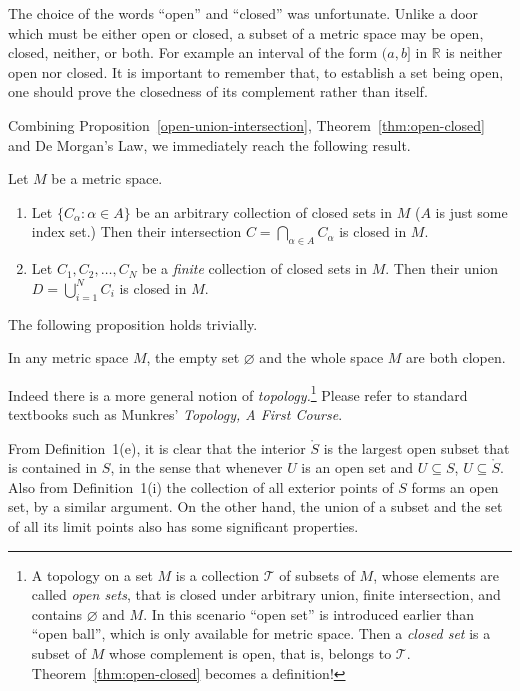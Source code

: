 \documentclass[11pt]{article}
\begin{document}
The choice of the words ``open'' and ``closed'' was unfortunate.
Unlike a door which must be either open or closed, a subset of a metric space may be open, closed, neither, or both.
For example an interval of the form $(a,b]$ in $\mathbb{R}$ is neither open nor closed.
It is important to remember that, to establish a set being open, one should prove the closedness of its complement rather than itself.

Combining Proposition~\ref{open-union-intersection}, Theorem~\ref{thm:open-closed} and De Morgan's Law, we immediately reach the following result.

\begin{prop}
  \label{closed-union-intersection}
  Let $M$ be a metric space.
  \begin{enumerate}[$(a)$]
    \item Let $\{ C_\alpha \colon \alpha \in A \}$ be an arbitrary collection of closed sets in $M$ ($A$ is just some index set.)
      Then their intersection $C = \displaystyle \bigcap_{\alpha \in A} C_\alpha$ is closed in $M$.

    \item Let $C_1, C_2, \dots, C_N$ be a {\em finite} collection of closed sets in $M$.
      Then their union $D = \displaystyle \bigcup_{i=1}^N C_i$ is closed in $M$.
  \end{enumerate}
\end{prop}

The following proposition holds trivially.

\begin{prop}
  \label{empty-universal-clopen}
  In any metric space $M$, the empty set $\varnothing$ and the whole space $M$ are both clopen.
\end{prop}

Indeed there is a more general notion of {\em topology.}\footnote{A \textsf{topology} on a set $M$ is a collection $\mathcal T$ of subsets of $M$, whose elements are called {\em open sets}, that is closed under arbitrary union, finite intersection, and contains $\varnothing$ and $M$.  In this scenario ``open set'' is introduced earlier than ``open ball'', which is only available for metric space.  Then a {\em closed set} is a subset of $M$ whose complement is open, that is, belongs to $\mathcal T$.  Theorem~\ref{thm:open-closed} becomes a definition!}
Please refer to standard textbooks such as Munkres' {\em Topology, A First Course}.

From Definition~1(e), it is clear that the interior $\mathring{S}$ is the largest open subset that is contained in $S$, in the sense that whenever $U$ is an open set and $U \subseteq S$, $U \subseteq \mathring{S}$.
Also from Definition~1(i) the collection of all exterior points of $S$ forms an open set, by a similar argument. 
On the other hand, the union of a subset and the set of all its limit points also has some significant properties.
\end{document}
